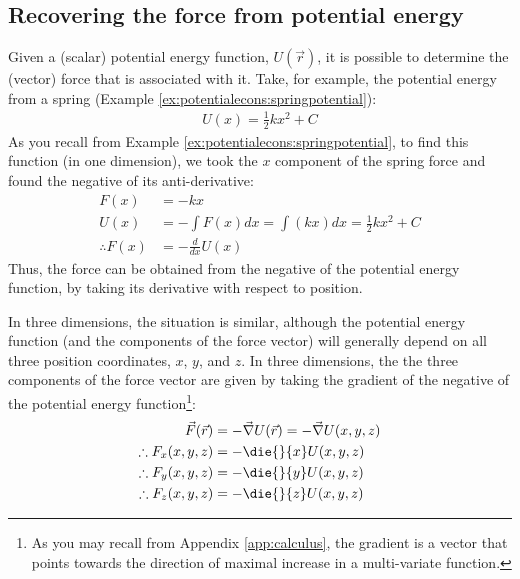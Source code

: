 \subsection{Recovering the force from potential energy}
Given a (scalar) potential energy function, $U(\vec r)$, it is possible to determine the (vector) force that is associated with it. Take, for example, the potential energy from a spring (Example \ref{ex:potentialecons:springpotential}):
\begin{align*}
U(x) = \frac{1}{2}kx^2 + C
\end{align*} 
As you recall from Example \ref{ex:potentialecons:springpotential}, to find this function (in one dimension), we took the $x$ component of the spring force and found the negative of its anti-derivative:
\begin{align*}
F(x) &= -kx\\
U(x) &= -\int F(x) dx = \int (kx) dx = \frac{1}{2}kx^2+C\\
\therefore F(x) &= -\frac{d}{dx}U(x)
\end{align*}
Thus, the force can be obtained from the negative of the potential energy function, by taking its derivative with respect to position.

In three dimensions, the situation is similar, although the potential energy function (and the components of the force vector) will generally depend on all three position coordinates, $x$, $y$, and $z$. In three dimensions, the the three components of the force vector are given by taking the gradient of the negative of the potential energy function\footnote{As you may recall from Appendix \ref{app:calculus}, the gradient is a vector that points towards the direction of maximal increase in a multi-variate function.}:
\begin{align}
\vec F(\vec r) &= -\vec\nabla U(\vec r)=-\vec\nabla U(x,y,z)\nonumber\\
\therefore F_x(x,y,z) &= -\die{}{x}U(x,y,z)\nonumber\\
\therefore F_y(x,y,z) &= -\die{}{y}U(x,y,z)\nonumber\\
\therefore F_z(x,y,z) &= -\die{}{z}U(x,y,z)
\end{align}

